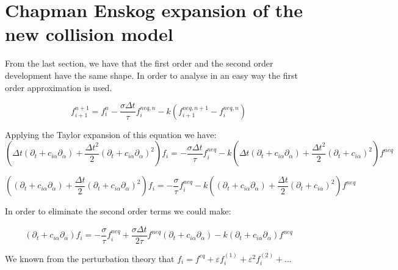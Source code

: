 \documentclass{article}
\begin{document}
\section{Chapman Enskog expansion of the new collision model}
From the last section, we have that the first order and the second order development have the same shape. In order to analyse in an easy way the first order approximation is
used.

\begin{equation}
    f_{i+1}^{n+1} =f_{i}^{n} -\frac{\sigma\Delta t}{\tau } f_{i}^{neq,n} -k\left( f_{i+1}^{neq,n+1} -f_{i}^{neq,n}\right)
\end{equation}

Applying the Taylor expansion of this equation we have:
\begin{equation}
    \left( \Delta t( \partial _{t} +c_{i\alpha } \partial _{\alpha }) +\frac{\Delta t^{2}}{2}( \partial _{t} +c_{i\alpha } \partial _{\alpha })^{2}\right) f_{i} = -\frac{\sigma\Delta t}{\tau } f_{i}^{neq} -k\left( \Delta t( \partial _{t} +c_{i\alpha } \partial _{\alpha }) +\frac{\Delta t^{2}}{2}( \partial _{t} +c_{i\alpha })^{2}\right) f^{neq}
\end{equation}

\begin{equation*}
    \left(( \partial _{t} +c_{i\alpha } \partial _{\alpha }) +\frac{\Delta t}{2}( \partial _{t} +c_{i\alpha } \partial _{\alpha })^{2}\right) f_{i} = -\frac{\sigma}{\tau } f_{i}^{neq} -k\left(( \partial _{t} +c_{i\alpha } \partial _{\alpha }) +\frac{\Delta t}{2}( \partial _{t} +c_{i\alpha })^{2}\right) f^{neq}
\end{equation*}

In order to eliminate the second order terms we could make:

\begin{equation}
    ( \partial _{t} +c_{i\alpha } \partial _{\alpha }) f_{i} = -\frac{\sigma}{\tau } f_{i}^{neq} +\frac{\sigma\Delta t}{2\tau } f^{neq}( \partial _{t} +c_{i\alpha } \partial _{\alpha }) -k( \partial _{t} +c_{i\alpha } \partial _{\alpha }) f^{neq}
\end{equation}

We known from the perturbation theory that $f_{i} =f^{eq} +\varepsilon f_{i}^{( 1)} +\varepsilon ^{2} f_{i}^{( 2)} +...$
\end{document}
